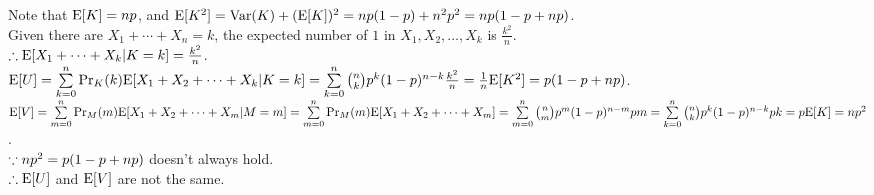 \begin{pr}
Note that $\mathrm{E}[K]=np$, and $\mathrm{E}[K^2]=\mathrm{Var}(K)+(\mathrm{E}[K])^2=np(1-p)+n^2p^2=np(1-p+np)$.\\
Given there are $X_1+\cdots+X_n=k$, the expected number of $1$ in $X_1, X_2, \dots, X_k$ is $\frac{k^2}n$.\\
$\therefore\mathrm{E}[X_1+\cdots+X_k|K=k]=\frac{k^2}n$.\\
$\mathrm{E}[U]=\sum\limits_{k=0}^n\mathrm{Pr}_K(k)\mathrm{E}[X_1+X_2+\cdots+X_k|K=k]=\sum\limits_{k=0}^n\binom nkp^k(1-p)^{n-k}\frac{k^2}n=\frac1n\mathrm{E}[K^2]=p(1-p+np)$.\\
$\mathrm{E}[V]=\sum\limits_{m=0}^n\mathrm{Pr}_M(m)\mathrm{E}[X_1+X_2+\cdots+X_m|M=m]=\sum\limits_{m=0}^n\mathrm{Pr}_M(m)\mathrm{E}[X_1+X_2+\cdots+X_m]=\sum\limits_{m=0}^n\binom nmp^m(1-p)^{n-m}pm=\sum\limits_{k=0}^n\binom nkp^k(1-p)^{n-k}pk=p\mathrm{E}[K]=np^2$.\\
$\because np^2=p(1-p+np)$ doesn't always hold.\\
$\therefore\mathrm{E}[U]$ and $\mathrm{E}[V]$ are not the same.
\end{pr}
